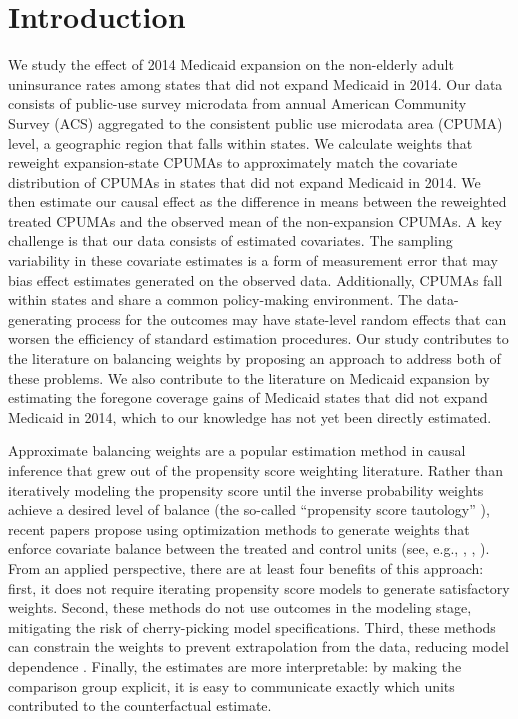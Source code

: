 \documentclass[aoas]{imsart}
\theoremstyle{plain}
\theoremstyle{remark}
\begin{document}
\section{Introduction}

We study the effect of 2014 Medicaid expansion on the non-elderly adult uninsurance rates among states that did not expand Medicaid in 2014. Our data consists of public-use survey microdata from annual American Community Survey (ACS) aggregated to the consistent public use microdata area (CPUMA) level, a geographic region that falls within states. We calculate weights that reweight expansion-state CPUMAs to approximately match the covariate distribution of CPUMAs in states that did not expand Medicaid in 2014. We then estimate our causal effect as the difference in means between the reweighted treated CPUMAs and the observed mean of the non-expansion CPUMAs. A key challenge is that our data consists of estimated covariates. The sampling variability in these covariate estimates is a form of measurement error that may bias effect estimates generated on the observed data. Additionally, CPUMAs fall within states and share a common policy-making environment. The data-generating process for the outcomes may have state-level random effects that can worsen the efficiency of standard estimation procedures. Our study contributes to the literature on balancing weights by proposing an approach to address both of these problems. We also contribute to the literature on Medicaid expansion by estimating the foregone coverage gains of Medicaid states that did not expand Medicaid in 2014, which to our knowledge has not yet been directly estimated.

Approximate balancing weights are a popular estimation method in causal inference that grew out of the propensity score weighting literature. Rather than iteratively modeling the propensity score until the inverse probability weights achieve a desired level of balance (the so-called ``propensity score tautology'' \cite{imai2014covariate}), recent papers propose using optimization methods to generate weights that enforce covariate balance between the treated and control units (see, e.g., \cite{hainmueller2012entropy}, \cite{imai2014covariate}, \cite{zubizarreta2015stable}). From an applied perspective, there are at least four benefits of this approach: first, it does not require iterating propensity score models to generate satisfactory weights. Second, these methods do not use outcomes in the modeling stage, mitigating the risk of cherry-picking model specifications. Third, these methods can constrain the weights to prevent extrapolation from the data, reducing model dependence \cite{zubizarreta2015stable}. Finally, the estimates are more interpretable: by making the comparison group explicit, it is easy to communicate exactly which units contributed to the counterfactual estimate.
\end{document}
